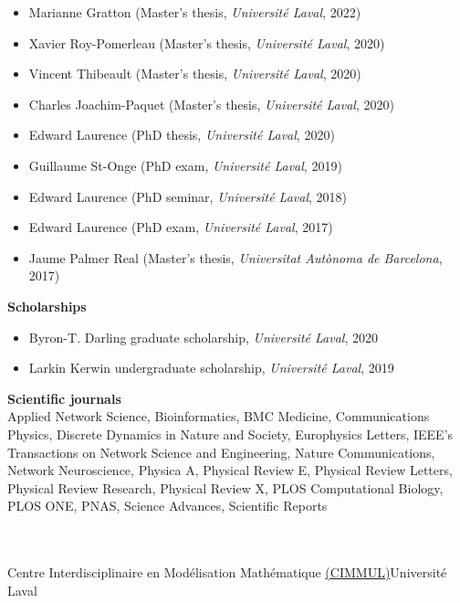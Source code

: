 \documentclass[11pt]{article}
\newcommand{\TitreSection}[1]{\colorbox{background}{\makebox[\textwidth-0.5em][c]{\Large\textrm{\textsc{#1}}}}\vspace{0.75\baselineskip}\\}
\begin{document}
\begin{itemize}
  \item Marianne Gratton (Master's thesis, \textit{Universit\'e Laval}, 2022)
  \item Xavier Roy-Pomerleau (Master's thesis, \textit{Universit\'e Laval}, 2020)
  \item Vincent Thibeault (Master's thesis, \textit{Universit\'e Laval}, 2020)
  \item Charles Joachim-Paquet (Master's thesis, \textit{Universit\'e Laval}, 2020)
  \item Edward Laurence (PhD thesis, \textit{Universit\'e Laval}, 2020)
  \item Guillaume St-Onge (PhD exam, \textit{Universit\'e Laval}, 2019)
  \item Edward Laurence (PhD seminar, \textit{Universit\'e Laval}, 2018)
  \item Edward Laurence (PhD exam, \textit{Universit\'e Laval}, 2017)
  \item Jaume Palmer Real (Master's thesis, \textit{Universitat Aut\`onoma de Barcelona}, 2017)
\end{itemize}
%
%
%
\textbf{Scholarships}
%
\begin{itemize}
  \item Byron-T. Darling graduate scholarship, \textit{Universit\'e Laval}, 2020
  \item Larkin Kerwin undergraduate scholarship, \textit{Universit\'e Laval}, 2019
\end{itemize}
%
%
%
\parbox{\textwidth}{\textbf{Scientific journals}\\
%
Applied Network Science, Bioinformatics, BMC Medicine, Communications Physics, Discrete Dynamics in Nature and Society, Europhysics Letters, IEEE's Transactions on Network Science and Engineering, Nature Communications, Network Neuroscience, Physica A, Physical Review E, Physical Review Letters, Physical Review Research, Physical Review X, PLOS Computational Biology, PLOS ONE, PNAS, Science Advances, Scientific Reports} \vspace{1.75\baselineskip} \\
%
%
%
%
%
\TitreSection{Administrative Activities}
%
Centre Interdisciplinaire en Modélisation Mathématique \href{http://cimmul.fsg.ulaval.ca}{(CIMMUL)}\hfill Universit\'e Laval\\
\end{document}
